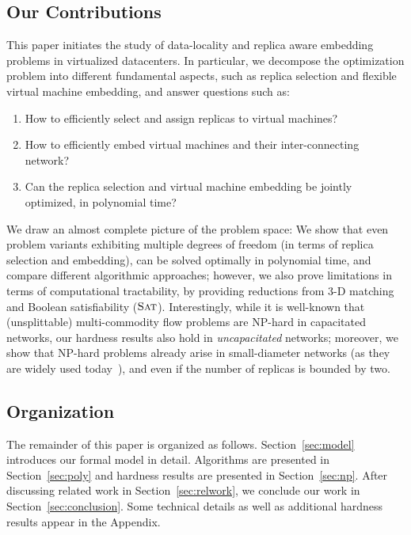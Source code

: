 \documentclass[9pt]{sigcomm-alternate}
\newcommand{\SAT}{\textsc{Sat}}
\begin{document}
\subsection{Our Contributions}

This paper initiates the study of data-locality and replica aware embedding problems in virtualized datacenters.
In particular, we decompose the optimization problem into different fundamental aspects, such as
replica selection and flexible virtual machine embedding, and answer questions such as:
\begin{enumerate}
\item How to efficiently select and assign replicas to virtual machines?

\item How to efficiently embed virtual machines and their inter-connecting network?

\item Can the replica selection and virtual machine embedding be jointly optimized, in polynomial time?
\end{enumerate}

We draw an almost complete picture of the problem space: We show that
even problem variants exhibiting multiple degrees of freedom (in terms of
replica selection and embedding),
can be solved optimally in polynomial time, and compare different
algorithmic approaches; however, we also prove limitations in terms of
computational tractability, by providing reductions from 3-D matching
and Boolean satisfiability ($\SAT$). Interestingly,
while it is well-known that (unsplittable) multi-commodity flow
problems are NP-hard in capacitated networks, our hardness results also hold in \emph{uncapacitated}
networks; moreover, we show that NP-hard problems already arise in small-diameter networks (as they are
widely used today~\cite{fattree}),
and even if the number of replicas is bounded by two.


\subsection{Organization}

The remainder of this paper is organized as follows.
Section~\ref{sec:model} introduces our formal model in detail.
Algorithms are presented in Section~\ref{sec:poly} and
hardness results are presented in Section~\ref{sec:np}.
After discussing related work in Section~\ref{sec:relwork},
we conclude our work in Section~\ref{sec:conclusion}.
Some technical details as well as additional hardness results
appear in the Appendix.
\end{document}
